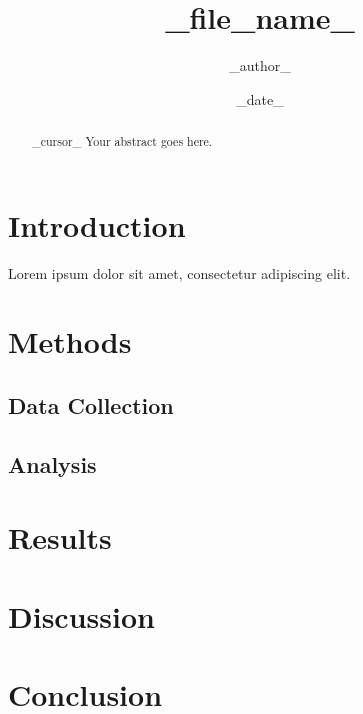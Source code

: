 \documentclass[12pt]{article}
\title{{{_file_name_}}}
\author{{{_author_}}}
\date{{{\_date\_}}}
\begin{document}
\maketitle

\begin{abstract}
{{_cursor_}}
Your abstract goes here.
\end{abstract}

\section{Introduction}

Lorem ipsum dolor sit amet, consectetur adipiscing elit.

\section{Methods}

\subsection{Data Collection}

\subsection{Analysis}

\section{Results}

\section{Discussion}

\section{Conclusion}



\end{document}
